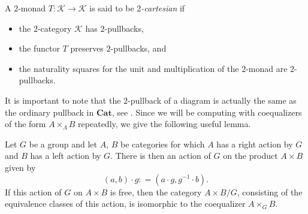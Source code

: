 \documentclass{amsbook} %
\newcommand{\mb}{\mathbf}
\numberwithin{section}{chapter}
\begin{document}
\begin{Defi}
A $2$-monad $T \colon \mathcal{K} \rightarrow \mathcal{K}$ is said to be \textit{$2$-cartesian} if
    \begin{itemize}
        \item the $2$-category $\mathcal{K}$ has $2$-pullbacks,
        \item the functor $T$ preserves $2$-pullbacks, and
        \item the naturality squares for the unit and multiplication of the $2$-monad are $2$-pullbacks.
    \end{itemize}
\end{Defi}

It is important to note that the  $2$-pullback of a diagram is actually the same as the ordinary pullback in $\mb{Cat}$, see \cite{kelly-elem}. Since we will be computing with coequalizers of the form $A \times_{\Lambda} B$ repeatedly, we give the following useful lemma.

\begin{lem}\label{coeq-lem}
Let $G$ be a group and let $A$, $B$ be categories for which $A$ has a right action by $G$ and $B$ has a left action by $G$. There is then an action of $G$ on the product $A \times B$ given by
    \[
        (a,b) \cdot g \colon= (a \cdot g, g^{-1} \cdot b).
    \]
If this action of $G$ on $A \times B$ is free, then the category $A \times B/G$, consisting of the equivalence classes of this action, is isomorphic to the coequalizer $A \times_G B$.
\end{lem}
%
\end{document}
